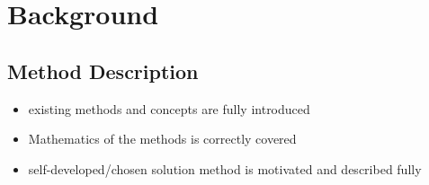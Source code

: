 \chapter{Background}
\label{cha:background}

\section{Method Description}
\label{sec:method_description}
\begin{itemize}
    \item existing methods and concepts are fully introduced
    \item Mathematics of the methods is correctly covered
    \item self-developed/chosen solution method is motivated and described fully
\end{itemize}
